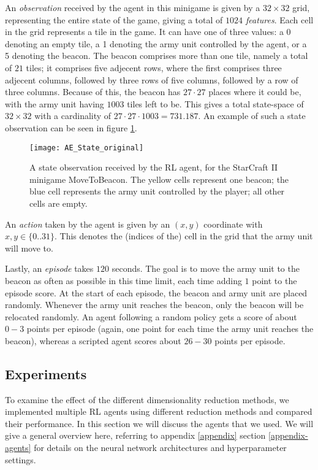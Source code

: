 An \emph{observation} received by the agent in this minigame is given by a $32 \times 32$ grid, representing the entire state of the game,  giving a total of \emph{$1024$ features}. Each cell in the grid represents a tile in the game. It can have one of three values: a 0 denoting an empty tile, a 1 denoting the army unit controlled by the agent, or a 5 denoting the beacon. The beacon comprises more than one tile, namely a total of $21$ tiles; it comprises five adjecent rows, where the first comprises three adjecent columns, followed by three rows of five columns, followed by a row of three columns. Because of this, the beacon has $27 \cdot 27$ places where it could be, with the army unit having $1003$ tiles left to be. This gives  a total state-space of $32 \times 32$ with a cardinality of $27 \cdot 27 \cdot 1003 = 731.187$. An example of such a state observation can be seen in figure \ref{fig:state_example}.

\begin{figure}[h]
    \centering
    \texttt{[image: AE\_State\_original]}
    \caption{A state observation received by the RL agent, for the StarCraft II minigame MoveToBeacon. The yellow cells represent one beacon; the blue cell represents the army unit controlled by the player; all other cells are empty.}
    \label{fig:state_example}
\end{figure}

An \emph{action} taken by the agent is given by an $(x,y)$ coordinate with $x,y \in \{0 .. 31\}$. This denotes the (indices of the) cell in the grid that the army unit will move to.

Lastly, an \emph{episode} takes $120$ seconds. The goal is to move the army unit to the beacon as often as possible in this time limit, each time adding $1$ point to the episode score. At the start of each episode, the beacon and army unit are placed randomly. Whenever the army unit reaches the beacon, only the beacon will be relocated randomly. An agent following a random policy gets a score of about $0-3$ points per episode (again, one point for each time the army unit reaches the beacon), whereas a scripted agent scores about $26-30$ points per episode.

\subsection{Experiments}\label{research-exp}
To examine the effect of the different dimensionality reduction methods, we implemented multiple RL agents using different reduction methods and compared their performance. In this section we will discuss the agents that we used. We will give a general overview here, referring to appendix \ref{appendix} section \ref{appendix-agents} for details on the neural network architectures and hyperparameter settings. 

